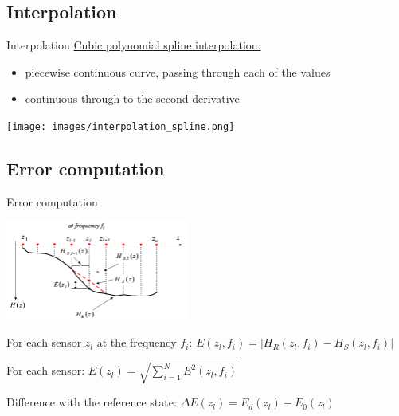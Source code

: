 \documentclass{beamer}
\begin{document}
\subsection{Interpolation}
\begin{frame}{Interpolation}
\underline{Cubic polynomial spline interpolation:}
\begin{itemize}
\item piecewise continuous curve, passing through each of the values
\item continuous through to the second derivative
\end{itemize}

\begin{center}
\texttt{[image: images/interpolation\_spline.png]}
\end{center}

\end{frame}

\subsection{Error computation}
\begin{frame}{Error computation}

\begin{center}
\includegraphics[width=6cm]{images/interpolation.png}
\end{center}

For each sensor $z_l$ at the frequency $f_i$:
$E(z_l,f_i) = | H_R(z_l,f_i) - H_S(z_l,f_i) |$


\pause

For each sensor:
$E(z_l) = \sqrt{  \sum\limits_{i=1}^N  E^2(z_l,f_i) }$

\pause

Difference with the reference state:
$\Delta E(z_l) = E_d(z_l) - E_0(z_l)$

\end{frame}
\end{document}

